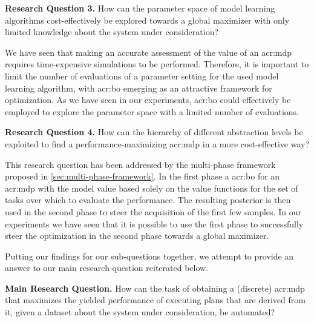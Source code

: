 \vspace{16pt}
\noindent%
\textbf{Research Question 3.} How can the parameter space of model learning algorithms cost-effectively be explored towards a global maximizer with only limited knowledge about the system under consideration?
\vspace{12pt}

We have seen that making an accurate assessment of the value of an \acrshort{acr:mdp} requires time-expensive simulations to be performed.
Therefore, it is important to limit the number of evaluations of a parameter setting for the used model learning algorithm, with \acrshort{acr:bo} emerging as an attractive framework for optimization.
As we have seen in our experiments, \acrshort{acr:bo} could effectively be employed to explore the parameter space with a limited number of evaluations.

\newpage

\vspace{16pt}
\noindent%
\textbf{Research Question 4.} How can the hierarchy of different abstraction levels be exploited to find a performance-maximizing \acrshort{acr:mdp} in a more cost-effective way?
\vspace{12pt}

This research question has been addressed by the multi-phase framework proposed in \autoref{sec:multi-phase-framework}.
In the first phase a \acrshort{acr:bo} for an \acrshort{acr:mdp} with the model value based solely on the value functions for the set of tasks over which to evaluate the performance.
The resulting posterior is then used in the second phase to steer the acquisition of the first few samples.
In our experiments we have seen that it is possible to use the first phase to successfully steer the optimization in the second phase towards a global maximizer.
\vspace{12pt}

Putting our findings for our sub-questions together, we attempt to provide an answer to our main research question reiterated below.

\vspace{12pt}
\noindent%
\textbf{Main Research Question.} How can the task of obtaining a (discrete) \acrshort{acr:mdp} that maximizes the yielded performance of executing plans that are derived from it, given a dataset about the system under consideration, be automated?
\vspace{12pt}

